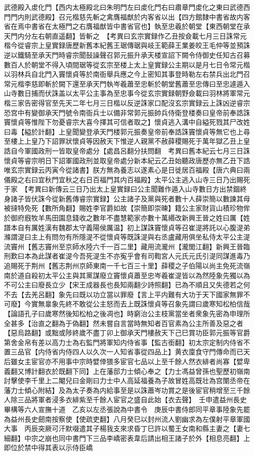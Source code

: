 武德殿入䖍化門【西内太極殿北曰朱明門左曰䖍化門右曰肅章門䖍化之東曰武德西門門内則武德殿】召元楷慈先斬之禽膺福猷於内客省以出【四方館隸中書省故内客省在焉中書省在太極門之右膺福猷皆中書省官也】執至忠羲於朝堂【東西朝堂在承天門内分左右朝直遥翻】皆斬之　【考異曰玄宗實録作乙丑按僉載七月三日誅常元楷今從睿宗上皇實録唐歷新舊本紀舊王琚傳琚與岐王範薛王業姜皎王毛仲等並預誅逆以鐵騎至承天門時睿宗聞鼔譟聲召郭元振升承天楼宣詔下闕令侍御史任知古召募數百人於朝堂不得入頃間琚等從玄宗至楼上太上皇實録公主期以是月七日令常元楷以羽林兵自北門入竇懷貞等於南衙舉兵應之今上密知其事登時勒左右禁兵出北門召常元楷李慈即斬於闕下還至承天門執岑羲蕭至忠斬於朝堂舊蕭至忠傳曰至忠遽遁入山寺數日捕而伏誅盖以太平公主事為至忠事今從玄宗實録朝野僉載曰羽林將軍常元楷三家告密得官至先天二年七月三日楷以反逆誅家口配沒玄宗實録云上誅凶逆睿宗恐宫中有變御承天門號令南衙兵士以備非常郭元振帥兵侍衛登楼奏曰皇帝前奉誥誅竇懷貞等惟陛下勿憂睿宗大喜今擇其可信者取之】懷貞逃入溝中自縊死戮其尸改姓曰毒【縊於計翻】上皇聞變登承天門楼郭元振奏皇帝前奉誥誅竇懷貞等無它也上尋至樓上上皇乃下詔罪狀懷貞等因赦天下惟逆人親黨不赦薛稷賜死于萬年獄乙丑上皇誥自今軍國政刑一皆取皇帝處分【處昌呂翻分扶問翻　考異曰舊本紀云七月三日誅懷貞等睿宗明日下詔軍國政刑並取皇帝處分新本紀云乙丑始聽政唐歷亦無乙丑下誥唯玄宗實録云丙寅今從諸書】朕方無為養志以遂素心是日徙居百福殿【唐六典曰兩儀殿之右曰宜秋門宜秋之右日百福門其内百福殿】太平公主逃入山寺三日乃出賜死于家　【考異曰新傳云三日乃出太上皇實録曰公主聞難作遁入山寺數日方出禁錮終身諸子皆伏誅今從新舊傳睿宗實録】公主諸子及黨與死者數十人薛崇簡以數諫其母被撻特免死【數所角翻】賜姓李官爵如故【崇簡即崇暕】籍公主家財貨山積珍物侔於御府廐牧羊馬田園息錢收之數年不盡慧範家亦數十萬緡改新興王晉之姓曰厲【姓譜本自有厲姓漢有魏郡太守義陽侯厲温】初上謀誅竇懷貞等召崔湜將託以心腹湜弟滌謂湜曰主上有問勿有所隱湜不從懷貞等既誅湜與右丞盧藏用俱坐私侍太平公主湜流竇州【舊志竇州至京師水陸六千一百二里】藏用流瀧州【瀧閭江翻】新興王晉臨刑歎曰本為此謀者崔湜今吾死湜生不亦寃乎會有司鞫宮人元氏元氏引湜同謀進毒乃追賜死于荆州【舊志荆州京師東南一千七百三十里】薛稷之子伯陽以尚主免死流嶺南於道自殺初太平公主與其黨謀廢立竇懷貞蕭至忠岑羲崔湜皆以為然陸象先獨以為不可公主曰廢長立少【宋王成器長也長知兩翻少詩照翻】已為不順且又失德若之何不去【去羌呂翻】象先曰既以功立當以罪廢【言上平内難有大功于天下國家無罪不可廢】今實無辠象先終不敢從公主怒而去上既誅懷貞等召象先謂曰歲寒知松柏信哉【論語孔子曰歲寒然後知松柏之後凋也】時窮治公主枝黨當坐者衆象先密為申理所全甚多【治直之翻為于偽翻】然未嘗自言當時無知者百官素為公主所善及惡之者【惡烏路翻】或黜或陟終歲不盡丁卯上御承天門樓赦天下己巳賞功臣郭元振等官爵第舍金帛有差以高力士為右監門將軍知内侍省事【監古銜翻】初太宗定制内侍省不置三品官【内侍省内侍四人以久次一人知省事從四品上】黄衣廩食守門傳命而已天后雖女主宦官亦不用事中宗時嬖倖猥多宦官七品以上至千餘人然衣緋者尚寡【嬖卑義翻又博計翻衣於既翻下同】上在藩邸力士傾心奉之【力士馮益曾孫也聖歷初嶺南討擊使李千里上二閹兒曰金剛曰力士中人高延福養為子故冒姓高既壮為宫闈丞帝在藩力士傾心附結】及為太子奏為内給事至是以誅蕭岑功賞之是後宦官稍增至三千餘人除三品將軍者浸多衣緋紫至千餘人宦官之盛自此始【衣去聲】　壬申遣益州長史畢構等六人宣撫十道　乙亥以左丞張說為中書令　庚辰中書侍郎同平章事陸象先罷為益州長史劒南按察使【使疏吏翻】八月癸巳以封州流人劉幽求為左僕射平章軍國大事　丙辰突厥可汗默啜遣其子楊我支來求昏丁巳許以蜀王女南和縣主妻之【妻七細翻】中宗之崩也同中書門下三品李嶠密表韋后請出相王諸子於外【相息亮翻】上即位於禁中得其表以示侍臣嶠